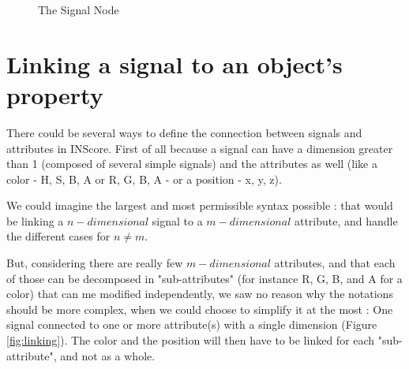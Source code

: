 \documentclass[a4paper]{article}
\begin{document}
\begin{figure}[h]

 \caption{The Signal Node}
 \label{fig:signalNode}
\end{figure}


\section{Linking a signal to an object's property}\label{sec:link}

There could be several ways to define the connection between signals and attributes in INScore. First of all because a signal can have a dimension greater than 1 (composed of several simple signals) and the attributes as well (like a color - H, S, B, A or R, G, B, A - or  a position - x, y, z). 

We could imagine the largest and most permissible syntax possible : that would be linking a $n-dimensional$ signal to a $m-dimensional$ attribute, and handle the different cases for $n \neq{} m$. 

But, considering there are really few $m-dimensional$ attributes, and that each of those can be decomposed in "sub-attributes" (for instance R, G, B, and A for a color) that can me modified independently, we saw no reason why the notations should be more complex, when we could choose to simplify it at the most : One signal connected to one or more attribute(s) with a single dimension (Figure \ref{fig:linking}). The color and the position will then have to be linked for each "sub-attribute", and not as a whole.
\\
\end{document}
